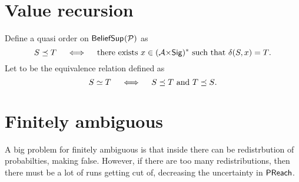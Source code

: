 %
\section{Value recursion}
%
\begin{definition}
Define a quasi order \emphdef{$\tord$} on $\mathsf{BeliefSup}_{}(\mathcal{P})$ as
\[
S \preceq T
\quad\iff\quad
\text{there exists $x\in (\mathcal{A}{\times}\mathsf{Sig})^*$ such that
$\delta(S,x) = T$.}
\]
Let \emphdef{$\teq$} to be the equivalence relation defined as
\[
S \simeq T
\quad\iff\quad
\text{$S\preceq T$ and $T\preceq S$.}
\]
\end{definition}
%
%
\section{Finitely ambiguous}
%
A big problem for finitely ambiguous is that inside  there can be redistrbution of probabilties,
making  false.
However, if there are too many redistributions, then there must be a lot of runs getting cut of,
decreasing the uncertainty in $\mathsf{PReach}{}$. 
%